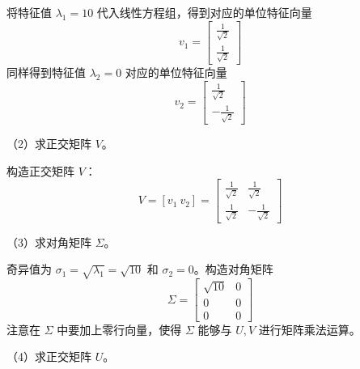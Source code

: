 \documentclass[UTF8, 12pt, fontset=fandol, oneside]{ctexart}
\begin{document}
将特征值 $\lambda_1=10$ 代入线性方程组，得到对应的单位特征向量
\[
v_1=\begin{bmatrix}\frac{1}{\sqrt2}\\[2mm]\frac{1}{\sqrt2}\end{bmatrix}
\]
同样得到特征值 $\lambda_2=0$ 对应的单位特征向量
\[
v_2=\begin{bmatrix}\frac{1}{\sqrt2}\\[2mm]-\frac{1}{\sqrt2}\end{bmatrix}
\]

（2）求正交矩阵 $V$。

构造正交矩阵 $V$：
\[
V=[v_1\ v_2]=
\begin{bmatrix}
\frac{1}{\sqrt2}&\frac{1}{\sqrt2}\\[2mm]
\frac{1}{\sqrt2}&-\frac{1}{\sqrt2}
\end{bmatrix}
\]

（3）求对角矩阵 $\Sigma$。

奇异值为 $\sigma_1=\sqrt{\lambda_1}=\sqrt{10}$ 和 $\sigma_2=0$。构造对角矩阵
\[
\Sigma=
\begin{bmatrix}
\sqrt{10}&0\\
0&0\\
0&0
\end{bmatrix}
\]
注意在 $\Sigma$ 中要加上零行向量，使得 $\Sigma$ 能够与 $U,V$ 进行矩阵乘法运算。

（4）求正交矩阵 $U$。
\end{document}
